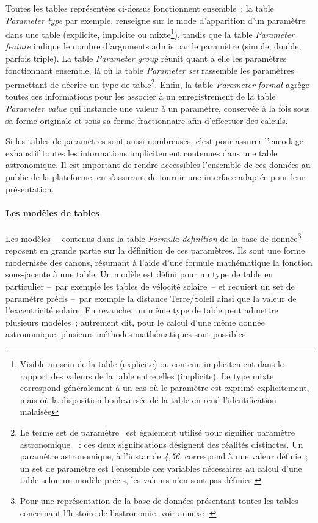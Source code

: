 \documentclass[a4paper,12pt,twoside]{book}
\newcommand{\eng}{\emph}
\newcommand{\g}[1]{\og#1~\fg}
\begin{document}
Toutes les tables représentées ci-dessus fonctionnent ensemble~: la table \eng{Parameter type} par exemple, renseigne sur le mode d'apparition d'un paramètre dans une table (explicite, implicite ou mixte\footnote{Visible au sein de la table (explicite) ou contenu implicitement dans le rapport des valeurs de la table entre elles (implicite). Le type mixte correspond généralement à un cas où le paramètre est exprimé explicitement, mais où la disposition bouleversée de la table en rend l'identification malaisée}), tandis que la table \eng{Parameter feature} indique le nombre d'arguments admis par le paramètre (simple, double, parfois triple). La table \eng{Parameter group} réunit quant à elle les paramètres fonctionnant ensemble, là où la table \eng{Parameter set} rassemble les paramètres permettant de décrire un type de table\footnote{Le terme \g{set de paramètre} est également utilisé pour signifier \g{paramètre astronomique}~: ces deux significations désignent des réalités distinctes. Un paramètre astronomique, à l'instar de \emph{4,56}, correspond à une valeur définie~; un set de paramètre est l'ensemble des variables nécessaires au calcul d'une table selon un modèle précis, les valeurs n'en sont pas définies.}. Enfin, la table \eng{Parameter format} agrège toutes ces informations pour les associer à un enregistrement de la table \eng{Parameter value} qui instancie une valeur à un paramètre, conservée à la fois sous sa forme originale et sous sa forme fractionnaire afin d'effectuer des calculs.

Si les tables de paramètres sont aussi nombreuses, c'est pour assurer l'encodage exhaustif toutes les informations implicitement contenues dans une table astronomique. Il est important de rendre accessibles l'ensemble de ces données au public de la plateforme, en s'assurant de fournir une interface adaptée pour leur présentation.

				\paragraph{\label{FormulaDefinition}Les modèles de tables}
Les modèles –~contenus dans la table \eng{Formula definition} de la base de donnée\footnote{Pour une représentation de la base de données présentant toutes les tables concernant l'histoire de l'astronomie, voir annexe \pageref{BaseDeDonnee}.}~– reposent en grande partie sur la définition de ces paramètres. Ils sont une forme modernisée des canons, résumant à l'aide d'une formule mathématique la fonction sous-jacente à une table. Un modèle est défini pour un type de table en particulier –~par exemple les tables de vélocité solaire~– et requiert un set de paramètre précis –~par exemple la distance Terre/Soleil ainsi que la valeur de l'excentricité solaire. En revanche, un même type de table peut admettre plusieurs modèles~; autrement dit, pour le calcul d'une même donnée astronomique, plusieurs méthodes mathématiques sont possibles.
\end{document}
